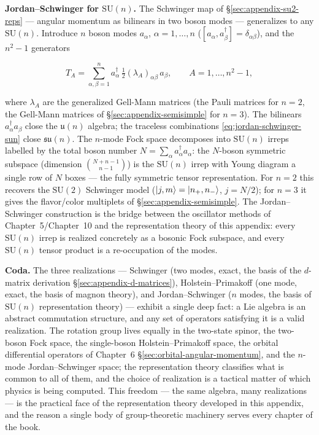 \medskip\noindent\textbf{Jordan--Schwinger for $\mathrm{SU}(n)$.} The Schwinger map of \S\ref{sec:appendix-su2-reps} --- angular momentum as bilinears in two boson modes --- generalizes to any $\mathrm{SU}(n)$. Introduce $n$ boson modes $a_{\alpha}$, $\alpha=1,\ldots,n$ ($[a_{\alpha},a_{\beta}^{\dagger}]=\delta_{\alpha\beta}$), and the $n^{2}-1$ generators
\begin{linenomath}
\begin{equation}
T_{A}=\sum_{\alpha,\beta=1}^{n}a_{\alpha}^{\dagger}\,\tfrac12(\lambda_{A})_{\alpha\beta}\,a_{\beta},\qquad A=1,\ldots,n^{2}{-}1,
\label{eq:jordan-schwinger-sun}
\end{equation}
\end{linenomath}
where $\lambda_{A}$ are the generalized Gell-Mann matrices (the Pauli matrices for $n=2$, the Gell-Mann matrices of \S\ref{sec:appendix-semisimple} for $n=3$). The bilinears $a_{\alpha}^{\dagger}a_{\beta}$ close the $\mathfrak{u}(n)$ algebra; the traceless combinations \eqref{eq:jordan-schwinger-sun} close $\mathfrak{su}(n)$. The $n$-mode Fock space decomposes into $\mathrm{SU}(n)$ irreps labelled by the total boson number $N=\sum_{\alpha}a_{\alpha}^{\dagger}a_{\alpha}$: the $N$-boson symmetric subspace (dimension $\binom{N+n-1}{n-1}$) is the $\mathrm{SU}(n)$ irrep with Young diagram a single row of $N$ boxes --- the fully symmetric tensor representation. For $n=2$ this recovers the $\mathrm{SU}(2)$ Schwinger model ($\ket{j,m}=\ket{n_{+},n_{-}}$, $j=N/2$); for $n=3$ it gives the flavor/color multiplets of \S\ref{sec:appendix-semisimple}. The Jordan--Schwinger construction is the bridge between the oscillator methods of Chapter~5/Chapter~10 and the representation theory of this appendix: every $\mathrm{SU}(n)$ irrep is realized concretely as a bosonic Fock subspace, and every $\mathrm{SU}(n)$ tensor product is a re-occupation of the modes.

\medskip\noindent\textbf{Coda.} The three realizations --- Schwinger (two modes, exact, the basis of the $d$-matrix derivation \S\ref{sec:appendix-d-matrices}), Holstein--Primakoff (one mode, exact, the basis of magnon theory), and Jordan--Schwinger ($n$ modes, the basis of $\mathrm{SU}(n)$ representation theory) --- exhibit a single deep fact: a Lie algebra is an abstract commutation structure, and any set of operators satisfying it is a valid realization. The rotation group lives equally in the two-state spinor, the two-boson Fock space, the single-boson Holstein--Primakoff space, the orbital differential operators of Chapter~6 \S\ref{sec:orbital-angular-momentum}, and the $n$-mode Jordan--Schwinger space; the representation theory classifies what is common to all of them, and the choice of realization is a tactical matter of which physics is being computed. This freedom --- the same algebra, many realizations --- is the practical face of the representation theory developed in this appendix, and the reason a single body of group-theoretic machinery serves every chapter of the book.
